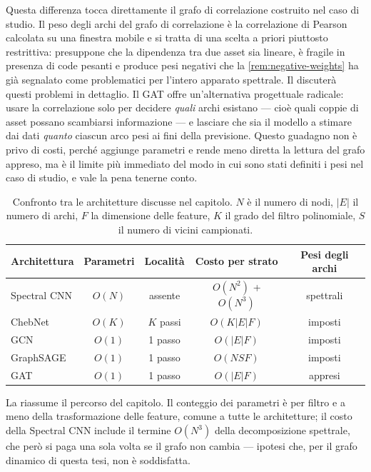 Questa differenza tocca direttamente il grafo di correlazione costruito nel caso di studio. Il peso degli archi del grafo di correlazione è la correlazione di Pearson calcolata su una finestra mobile e si tratta di una scelta a priori piuttosto restrittiva: presuppone che la dipendenza tra due asset sia lineare, è fragile in presenza di code pesanti e produce pesi negativi che la \cref{rem:negative-weights} ha già segnalato come problematici per l'intero apparato spettrale. Il  discuterà questi problemi in dettaglio. Il GAT offre un'alternativa progettuale radicale: usare la correlazione solo per decidere \emph{quali} archi esistano — cioè quali coppie di asset possano scambiarsi informazione — e lasciare che sia il modello a stimare dai dati \emph{quanto} ciascun arco pesi ai fini della previsione. Questo guadagno non è privo di costi, perché aggiunge parametri e rende meno diretta la lettura del grafo appreso, ma è il limite più immediato del modo in cui sono stati definiti i pesi nel caso di studio, e vale la pena tenerne conto.

\begin{table}[H]
\centering
\caption[Confronto tra le architetture spettrali e di message passing]{Confronto tra le architetture discusse nel capitolo. $N$ è il numero di nodi, $|E|$ il numero di archi, $F$ la dimensione delle feature, $K$ il grado del filtro polinomiale, $S$ il numero di vicini campionati.}
\label{tab:architectures-comparison}
\begin{tabular}{@{}lcccc@{}}
\toprule
\textbf{Architettura} & \textbf{Parametri} & \textbf{Località} & \textbf{Costo per strato} & \textbf{Pesi degli archi} \\
\midrule
Spectral CNN & $O(N)$    & assente & $O(N^2)$ + $O(N^3)$ & spettrali \\
ChebNet      & $O(K)$    & $K$ passi & $O(K|E|F)$        & imposti \\
GCN          & $O(1)$    & 1 passo  & $O(|E|F)$          & imposti \\
GraphSAGE    & $O(1)$    & 1 passo  & $O(NSF)$           & imposti \\
GAT          & $O(1)$    & 1 passo  & $O(|E|F)$          & appresi \\
\bottomrule
\end{tabular}
\end{table}

La  riassume il percorso del capitolo. Il conteggio dei parametri è per filtro e a meno della trasformazione delle feature, comune a tutte le architetture; il costo della Spectral CNN include il termine $O(N^3)$ della decomposizione spettrale, che però si paga una sola volta se il grafo non cambia — ipotesi che, per il grafo dinamico di questa tesi, non è soddisfatta.

